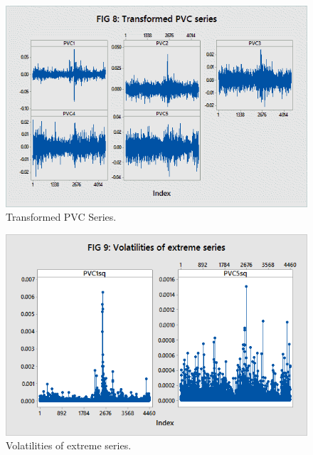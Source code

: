 	\begin{figure}[H]
	\centering
	\includegraphics[width=\textwidth]{chapters/chapter_mvts/figures/transpvc.png}
	\caption{Transformed PVC Series. \label{fig:transpvc}}
	\end{figure}


	\begin{figure}[H]
	\centering
	\includegraphics[width=\textwidth]{chapters/chapter_mvts/figures/volextreme.png}
	\caption{Volatilities of extreme series. \label{fig:volextreme}}
	\end{figure}


